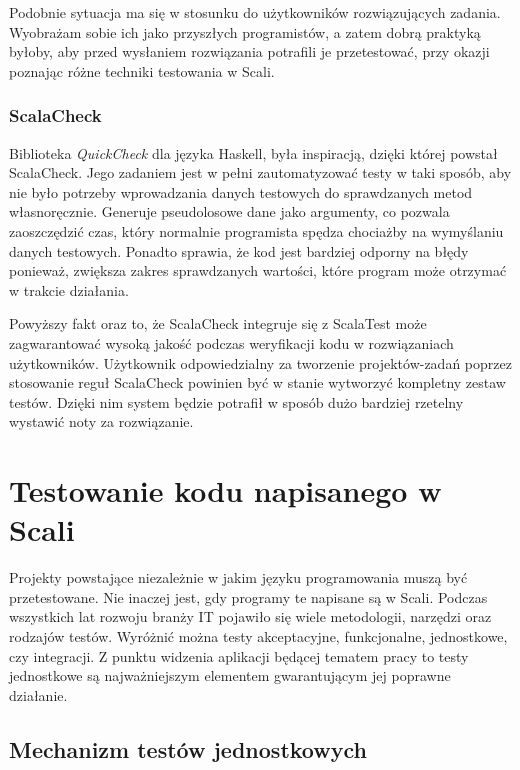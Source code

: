 \documentclass[brudnopis]{xmgr}
\begin{document}
Podobnie sytuacja ma się w stosunku do użytkowników rozwiązujących zadania. Wyobrażam sobie ich jako przyszłych programistów, a zatem dobrą praktyką byłoby, aby przed wysłaniem rozwiązania potrafili je przetestować, przy okazji poznając różne techniki testowania w Scali. 

\subsection{ScalaCheck}

\label{scalaCheckSrodek}

Biblioteka \emph{QuickCheck} dla języka Haskell, była inspiracją, dzięki której powstał ScalaCheck. Jego zadaniem jest w pełni zautomatyzować testy w taki sposób, aby nie było potrzeby wprowadzania danych testowych do sprawdzanych metod własnoręcznie. Generuje pseudolosowe dane jako argumenty, co pozwala zaoszczędzić czas, który normalnie programista spędza chociażby na wymyślaniu danych testowych. Ponadto sprawia, że kod jest bardziej odporny na błędy ponieważ, zwiększa zakres sprawdzanych wartości, które program może otrzymać w trakcie działania.

Powyższy fakt oraz to, że ScalaCheck integruje się z ScalaTest może zagwarantować wysoką jakość podczas weryfikacji kodu w rozwiązaniach użytkowników. Użytkownik odpowiedzialny za tworzenie projektów-zadań poprzez stosowanie reguł ScalaCheck powinien być w stanie wytworzyć kompletny zestaw testów. Dzięki nim system będzie potrafił w sposób dużo bardziej rzetelny wystawić noty za rozwiązanie.
      
\chapter{Testowanie kodu napisanego w Scali}      

Projekty powstające niezależnie w jakim języku programowania muszą być przetestowane. Nie inaczej jest, gdy programy te napisane są w Scali. Podczas wszystkich lat rozwoju branży IT pojawiło się wiele metodologii, narzędzi oraz rodzajów testów. Wyróżnić można testy akceptacyjne, funkcjonalne, jednostkowe, czy integracji. Z punktu widzenia aplikacji będącej tematem pracy to testy jednostkowe są najważniejszym elementem gwarantującym jej poprawne działanie.       
      
\section{Mechanizm testów jednostkowych}
\end{document}
